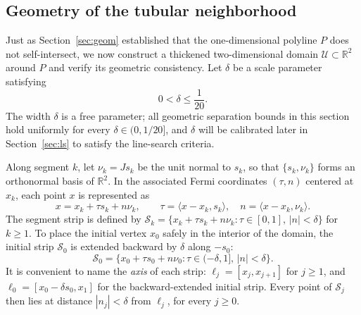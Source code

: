 \documentclass[11pt]{article}
\newcommand{\R}{\mathbb{R}}
\newcommand{\ip}[2]{\langle #1,#2\rangle}
\begin{document}
\subsection{Geometry of the tubular neighborhood}
\label{sec:orbit-tube}

Just as Section~\ref{sec:geom} established that the one-dimensional polyline $P$ does not self-intersect, we now construct a thickened two-dimensional domain $\mathcal U \subset \R^2$ around $P$ and verify its geometric consistency.
Let $\delta$ be a scale parameter satisfying
\begin{equation}
\label{eq:delta}
0 < \delta \le \frac{1}{20}.
\end{equation}
The width $\delta$ is a free parameter; all geometric separation bounds in this section hold uniformly for every $\delta \in (0, 1/20]$, and $\delta$ will be calibrated later in Section~\ref{sec:ls} to satisfy the line-search criteria.

Along segment $k$, let $\nu_k = J s_k$ be the unit normal to $s_k$, so that $\{s_k, \nu_k\}$ forms an orthonormal basis of $\R^2$.
In the associated Fermi coordinates $(\tau, n)$ centered at $x_k$, each point $x$ is represented as
\begin{equation}
\label{eq:fermi}
x = x_k + \tau s_k + n \nu_k, \qquad \tau = \ip{x-x_k}{s_k}, \quad n = \ip{x-x_k}{\nu_k}.
\end{equation}
The segment strip is defined by $\mathcal S_k = \{x_k + \tau s_k + n\nu_k : \tau \in [0, 1],\, |n| < \delta\}$ for $k \ge 1$.
To place the initial vertex $x_0$ safely in the interior of the domain, the initial strip $\mathcal S_0$ is extended backward by $\delta$ along $-s_0$:
\begin{equation}
\label{eq:S0}
\mathcal S_0 = \{x_0 + \tau s_0 + n\nu_0 : \tau \in (-\delta, 1],\, |n| < \delta\}.
\end{equation}
It is convenient to name the \emph{axis} of each strip: $\ell_j = [x_j, x_{j+1}]$ for $j \ge 1$, and $\ell_0 = [x_0 - \delta s_0, x_1]$ for the backward-extended initial strip.
Every point of $\mathcal S_j$ then lies at distance $|n_j| < \delta$ from $\ell_j$, for every $j \ge 0$.
\end{document}
